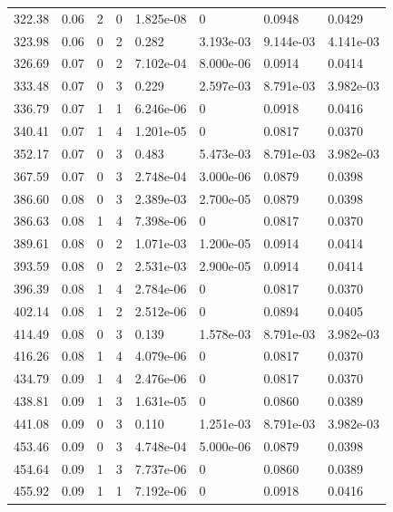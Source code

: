 \documentclass[preview]{standalone}
\begin{document}
{{{\begin{tabular}{L{1.2cm}C{1.2cm} C{0.3cm}C{0.5cm} C{1.4cm}C{1.4cm} C{1.4cm}C{1.4cm}}
  322.38  &  0.06  & 2     &  0 &  1.825e-08  & 0  & 0.0948 &  0.0429   \\ 
  323.98  &  0.06  & 0     &  2 &  0.282  & 3.193e-03  & 9.144e-03 &  4.141e-03   \\ 
  326.69  &  0.07  & 0     &  2 &  7.102e-04  & 8.000e-06  & 0.0914 &  0.0414   \\ 
  333.48  &  0.07  & 0     &  3 &  0.229  & 2.597e-03  & 8.791e-03 &  3.982e-03   \\ 
  336.79  &  0.07  & 1     &  1 &  6.246e-06  & 0  & 0.0918 &  0.0416   \\ 
  340.41  &  0.07  & 1     &  4 &  1.201e-05  & 0  & 0.0817 &  0.0370   \\ 
  352.17  &  0.07  & 0     &  3 &  0.483  & 5.473e-03  & 8.791e-03 &  3.982e-03   \\ 
  367.59  &  0.07  & 0     &  3 &  2.748e-04  & 3.000e-06  & 0.0879 &  0.0398   \\ 
  386.60  &  0.08  & 0     &  3 &  2.389e-03  & 2.700e-05  & 0.0879 &  0.0398   \\ 
  386.63  &  0.08  & 1     &  4 &  7.398e-06  & 0  & 0.0817 &  0.0370   \\ 
  389.61  &  0.08  & 0     &  2 &  1.071e-03  & 1.200e-05  & 0.0914 &  0.0414   \\ 
  393.59  &  0.08  & 0     &  2 &  2.531e-03  & 2.900e-05  & 0.0914 &  0.0414   \\ 
  396.39  &  0.08  & 1     &  4 &  2.784e-06  & 0  & 0.0817 &  0.0370   \\ 
  402.14  &  0.08  & 1     &  2 &  2.512e-06  & 0  & 0.0894 &  0.0405   \\ 
  414.49  &  0.08  & 0     &  3 &  0.139  & 1.578e-03  & 8.791e-03 &  3.982e-03   \\ 
  416.26  &  0.08  & 1     &  4 &  4.079e-06  & 0  & 0.0817 &  0.0370   \\ 
  434.79  &  0.09  & 1     &  4 &  2.476e-06  & 0  & 0.0817 &  0.0370   \\ 
  438.81  &  0.09  & 1     &  3 &  1.631e-05  & 0  & 0.0860 &  0.0389   \\ 
  441.08  &  0.09  & 0     &  3 &  0.110  & 1.251e-03  & 8.791e-03 &  3.982e-03   \\ 
  453.46  &  0.09  & 0     &  3 &  4.748e-04  & 5.000e-06  & 0.0879 &  0.0398   \\ 
  454.64  &  0.09  & 1     &  3 &  7.737e-06  & 0  & 0.0860 &  0.0389   \\ 
  455.92  &  0.09  & 1     &  1 &  7.192e-06  & 0  & 0.0918 &  0.0416   \\ 

\end{tabular}}}}
\end{document}
